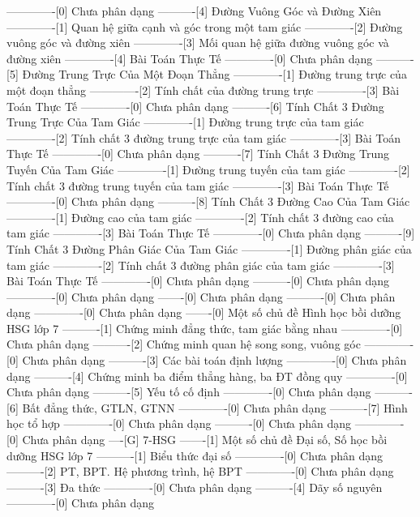 -------------[0] Chưa phân dạng
----------[4] Đường Vuông Góc và Đường Xiên
-------------[1] Quan hệ giữa cạnh và góc trong một tam giác
-------------[2] Đường vuông góc và đường xiên
-------------[3] Mối quan hệ giữa đường vuông góc và đường xiên
-------------[4] Bài Toán Thực Tế
-------------[0] Chưa phân dạng
----------[5] Đường Trung Trực Của Một Đoạn Thẳng
-------------[1] Đường trung trực của một đoạn thẳng
-------------[2] Tính chất của đường trung trực
-------------[3] Bài Toán Thực Tế
-------------[0] Chưa phân dạng
----------[6] Tính Chất 3 Đường Trung Trực Của Tam Giác
-------------[1] Đường trung trực của tam giác
-------------[2] Tính chất 3 đường trung trực của tam giác
-------------[3] Bài Toán Thực Tế
-------------[0] Chưa phân dạng
----------[7] Tính Chất 3 Đường Trung Tuyến Của Tam Giác
-------------[1] Đường trung tuyến của tam giác
-------------[2] Tính chất 3 đường trung tuyến của tam giác
-------------[3] Bài Toán Thực Tế
-------------[0] Chưa phân dạng
----------[8] Tính Chất 3 Đường Cao Của Tam Giác
-------------[1] Đường cao của tam giác
-------------[2] Tính chất 3 đường cao của tam giác
-------------[3] Bài Toán Thực Tế
-------------[0] Chưa phân dạng
----------[9] Tính Chất 3 Đường Phân Giác Của Tam Giác
-------------[1] Đường phân giác của tam giác
-------------[2] Tính chất 3 đường phân giác của tam giác
-------------[3] Bài Toán Thực Tế
-------------[0] Chưa phân dạng
----------[0] Chưa phân dạng
-------------[0] Chưa phân dạng
-------[0] Chưa phân dạng
----------[0] Chưa phân dạng
-------------[0] Chưa phân dạng
-------[0] Một số chủ đề Hình học bồi dưỡng HSG lớp 7
----------[1] Chứng minh đẳng thức, tam giác bằng nhau
-------------[0] Chưa phân dạng
----------[2] Chứng minh quan hệ song song, vuông góc
-------------[0] Chưa phân dạng
----------[3] Các bài toán định lượng
-------------[0] Chưa phân dạng
----------[4] Chứng minh ba điểm thẳng hàng, ba ĐT đồng quy
-------------[0] Chưa phân dạng
----------[5] Yếu tố cố định
-------------[0] Chưa phân dạng
----------[6] Bất đẳng thức, GTLN, GTNN
-------------[0] Chưa phân dạng
----------[7] Hình học tổ hợp
-------------[0] Chưa phân dạng
----------[0] Chưa phân dạng
-------------[0] Chưa phân dạng
----[G] 7-HSG
-------[1] Một số chủ đề Đại số, Số học bồi dưỡng HSG lớp 7
----------[1] Biểu thức đại số
-------------[0] Chưa phân dạng
----------[2] PT, BPT. Hệ phương trình, hệ BPT
-------------[0] Chưa phân dạng
----------[3] Đa thức
-------------[0] Chưa phân dạng
----------[4] Dãy số nguyên
-------------[0] Chưa phân dạng
